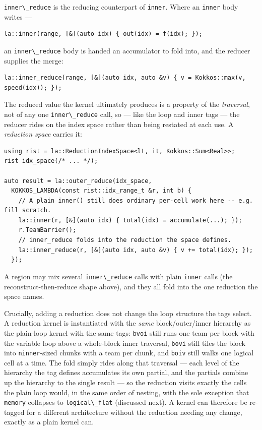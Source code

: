 \documentclass[11pt]{article}
\newcommand{\code}[1]{\lstinline[basicstyle=\ttfamily]|#1|}
\begin{document}
\code{inner\_reduce} is the reducing counterpart of \code{inner}. Where an
\code{inner} body writes ---
\begin{lstlisting}
la::inner(range, [&](auto idx) { out(idx) = f(idx); });
\end{lstlisting}
an \code{inner\_reduce} body is handed an accumulator to fold into, and the reducer
supplies the merge:
\begin{lstlisting}
la::inner_reduce(range, [&](auto idx, auto &v) { v = Kokkos::max(v, speed(idx)); });
\end{lstlisting}
The reduced value the kernel ultimately produces is a property of the
\emph{traversal}, not of any one \code{inner\_reduce} call, so --- like the loop and
inner tags --- the reducer rides on the index space rather than being restated at
each use. A \emph{reduction space} carries it:
\begin{lstlisting}
using rist = la::ReductionIndexSpace<lt, it, Kokkos::Sum<Real>>;
rist idx_space(/* ... */);

auto result = la::outer_reduce(idx_space,
  KOKKOS_LAMBDA(const rist::idx_range_t &r, int b) {
    // A plain inner() still does ordinary per-cell work here -- e.g. fill scratch.
    la::inner(r, [&](auto idx) { total(idx) = accumulate(...); });
    r.TeamBarrier();
    // inner_reduce folds into the reduction the space defines.
    la::inner_reduce(r, [&](auto idx, auto &v) { v += total(idx); });
  });
\end{lstlisting}
A region may mix several \code{inner\_reduce} calls with plain \code{inner} calls
(the reconstruct-then-reduce shape above), and they all fold into the one reduction
the space names.

Crucially, adding a reduction does not change the loop structure the tags select. A
reduction kernel is instantiated with the \emph{same} block/outer/inner hierarchy as
the plain-loop kernel with the same tags: \code{bvoi} still runs one team per block
with the variable loop above a whole-block inner traversal, \code{bovi} still tiles
the block into \code{ninner}-sized chunks with a team per chunk, and \code{boiv}
still walks one logical cell at a time. The fold simply rides along that traversal ---
each level of the hierarchy the tag defines accumulates its own partial, and the
partials combine up the hierarchy to the single result --- so the reduction visits
exactly the cells the plain loop would, in the same order of nesting, with the sole
exception that \code{memory} collapses to \code{logical\_flat} (discussed next). A
kernel can therefore be re-tagged for a different architecture without the reduction
needing any change, exactly as a plain kernel can.
\end{document}
